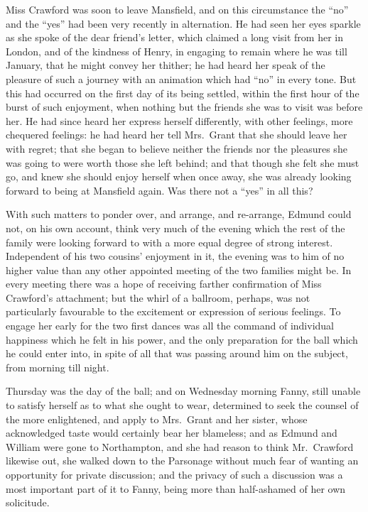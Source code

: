 \documentclass{article}
\begin{document}
Miss Crawford was soon to leave Mansfield, and on this
circumstance the ``no'' and the ``yes'' had been very recently
in alternation.  He had seen her eyes sparkle as she spoke
of the dear friend's letter, which claimed a long visit from
her in London, and of the kindness of Henry, in engaging
to remain where he was till January, that he might convey
her thither; he had heard her speak of the pleasure of such
a journey with an animation which had ``no'' in every tone.
But this had occurred on the first day of its being settled,
within the first hour of the burst of such enjoyment,
when nothing but the friends she was to visit was before her.
He had since heard her express herself differently,
with other feelings, more chequered feelings:  he had heard
her tell Mrs.\ Grant that she should leave her with regret;
that she began to believe neither the friends nor
the pleasures she was going to were worth those she
left behind; and that though she felt she must go,
and knew she should enjoy herself when once away, she was
already looking forward to being at Mansfield again.
Was there not a ``yes'' in all this?

With such matters to ponder over, and arrange, and re-arrange,
Edmund could not, on his own account, think very much
of the evening which the rest of the family were looking
forward to with a more equal degree of strong interest.
Independent of his two cousins' enjoyment in it,
the evening was to him of no higher value than any
other appointed meeting of the two families might be.
In every meeting there was a hope of receiving farther
confirmation of Miss Crawford's attachment; but the whirl
of a ballroom, perhaps, was not particularly favourable
to the excitement or expression of serious feelings.
To engage her early for the two first dances was all the
command of individual happiness which he felt in his power,
and the only preparation for the ball which he could
enter into, in spite of all that was passing around him
on the subject, from morning till night.

Thursday was the day of the ball; and on Wednesday
morning Fanny, still unable to satisfy herself as to what
she ought to wear, determined to seek the counsel of the
more enlightened, and apply to Mrs.\ Grant and her sister,
whose acknowledged taste would certainly bear her blameless;
and as Edmund and William were gone to Northampton,
and she had reason to think Mr.\ Crawford likewise out,
she walked down to the Parsonage without much fear of wanting
an opportunity for private discussion; and the privacy of
such a discussion was a most important part of it to Fanny,
being more than half-ashamed of her own solicitude.
\end{document}
